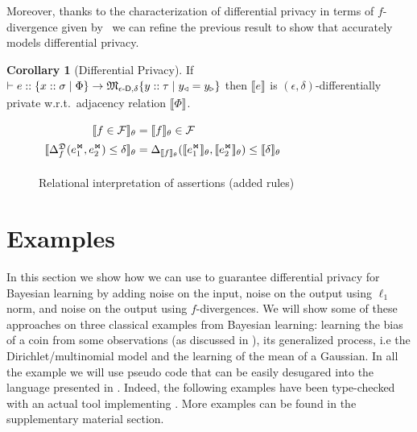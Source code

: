 \documentclass{sig-alternate-05-2015}
\theoremstyle{plain}
\theoremstyle{definition}
\theoremstyle{corollary}
\newtheorem{corollary}{Corollary}[section]
\def\lvmark{\triangleleft}
\def\rvmark{\triangleright}
\renewcommand{\l}[1]{#1_\lvmark}
\renewcommand{\r}[1]{#1_\rvmark}
\newcommand{\rmark}[1]{{#1}^{\Join}}
\newcommand{\rtref}[3]{\{ {#1} :: {#2} \vbar {#3} \}}
\newcommand{\interp}[2]{\llbracket {#2} \rrbracket_{#1}}
\newcommand{\vbar}[0]{\mathrel{|}}
\newcommand{\fdiv}{\ensuremath{f}}
\begin{document}
Moreover, thanks to the characterization of differential privacy in terms of \fdiv-divergence given by~\citet{BartheO13} we can refine the previous result to show that \THESYSTEM accurately models differential privacy.
\begin{corollary}[Differential Privacy]
  If $\vdash e :: \rtref{x}{\sigma}{\Phi} \rightarrow
  \mathfrak{M}_{\epsilon\textnormal{-}\mathsf{D},\delta}{\rtref{y}{\tau}{\l{y}=\r{y}}}$
  then $\interp{}{e}$ is $(\epsilon,\delta)$-differentially private
  w.r.t.\, adjacency relation $\interp{}{\Phi}$.
\end{corollary}
\begin{figure}
  \begin{center}
    $\begin{array}{r@{\;}c@{\;}l}
    
      \interp{\theta}{\fdiv\in\mathcal{F}} & = &
        \interp{\theta}{\fdiv}\in\mathcal{F}\\[.5em]
        \interp{\theta}{\Delta_\fdiv^\mathfrak{D}(\rmark{e}_1, \rmark{e}_2)\leq \delta} & = &
        \Delta_{\interp{\theta}{\fdiv}}(\interp{\theta}{\rmark{e}_1},
        \interp{\theta}{\rmark{e}_2})\leq \interp{\theta}{\delta}\\[.5em]
    
    \end{array}$
  \end{center}

 \caption{\label{fig:finterp} Relational interpretation of assertions (added rules)}
\end{figure}




\section{Examples}
\label{sec:examples}
In this section we show how we can use \THESYSTEM to guarantee
differential privacy for Bayesian learning by adding noise on the
input, noise on the output using $\ell_1$ norm, and noise on the
output using \fdiv-divergences.  
We will show some of these approaches on three classical examples
from Bayesian learning: 
learning the bias of a coin from some observations (as discussed in
), its generalized process, i.e the Dirichlet/multinomial model and the learning of the mean of a Gaussian. In all the example we will use
pseudo code that can be easily desugared into the language presented in
. Indeed, the following examples have been type-checked
with an actual tool implementing \THESYSTEM. More examples can be found in the supplementary material section.
\end{document}
